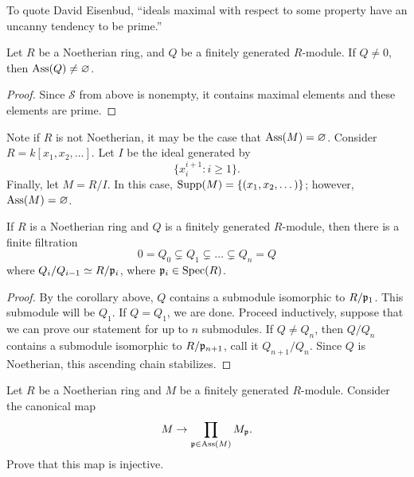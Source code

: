 \documentclass{ximera}
\begin{document}
To quote David Eisenbud, ``ideals maximal with respect to some
property have an uncanny tendency to be prime.''


\begin{corollary}
  Let $R$ be a Noetherian ring, and $Q$ be a finitely generated
  $R$-module. If $Q\ne 0$, then $\operatorname{Ass}(Q) \ne \varnothing$.
  \begin{proof}
    Since $\mathcal{S}$ from above is nonempty, it contains maximal
    elements and these elements are prime.
  \end{proof}
\end{corollary}




\begin{example}
  Note if $R$ is not Noetherian, it may be the case that
  $\operatorname{Ass}(M) = \varnothing$. Consider $R = k[x_1,x_2,\dots]$. Let $I$ be the ideal generated by
  \[
  \{x_i^{i+1}:i\ge 1\}.
  \]
  Finally, let $M = R/I$. In this case, $\operatorname{Supp}(M) =
  \{(x_1,x_2,\dots)\}$; however, $\operatorname{Ass}(M) = \varnothing$.
\end{example}




\begin{corollary}
  If $R$ is a Noetherian ring and $Q$ is a finitely generated
  $R$-module, then there is a finite filtration
  \[
  0 = Q_0 \subsetneq Q_1 \subsetneq \dots \subsetneq Q_n = Q 
  \]
  where $Q_i/Q_{i-1} \simeq R/\mathfrak{p}_i$, where $\mathfrak{p}_i\in\operatorname{Spec}(R)$.
  \begin{proof}
    By the corollary above, $Q$ contains a submodule isomorphic to
    $R/\mathfrak{p}_1$. This submodule will be $Q_1$. If $Q = Q_1$, we are
    done. Proceed inductively, suppose that we can prove our statement
    for up to $n$ submodules. If $Q \ne Q_n$, then $Q/Q_n$ contains a
    submodule isomorphic to $R/\mathfrak{p}_{n+1}$, call it $Q_{n+1}/Q_n$. Since
    $Q$ is Noetherian, this ascending chain stabilizes.
  \end{proof}
\end{corollary}

\begin{exercise}
  Let $R$ be a Noetherian ring and $M$ be a finitely generated $R$-module. Consider the canonical map
  \[
  M\to \prod_{\mathfrak{p}\in\operatorname{Ass}(M)} M_{\mathfrak{p}}.
  \]
  Prove that this map is injective.
\end{exercise}
\end{document}

